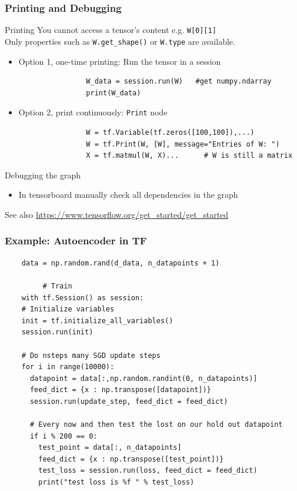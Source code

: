 \documentclass[mathserif]{beamer}
\begin{document}
\begin{frame}[fragile]
	\frametitle{Printing and Debugging}
	\begin{block}{Printing}
		You cannot access a tensor's content e.g. \texttt{W[0][1]}\\
		Only properties such as \texttt{W.get\_shape()} or \texttt{W.type} are available.
		\begin{itemize}		
			\item Option 1, one-time printing: Run the tensor in a session
			\begin{verbatim}
				W_data = session.run(W)   #get numpy.ndarray
				print(W_data) 
			\end{verbatim}
			\item Option 2, print continuously: \texttt{Print} node
			\begin{verbatim}
				W = tf.Variable(tf.zeros([100,100]),...)
				W = tf.Print(W, [W], message="Entries of W: ")
				X = tf.matmul(W, X)...		# W is still a matrix
			\end{verbatim}
		\end{itemize}
	\end{block}
	


	\begin{block}{Debugging the graph}
		\begin{itemize}
			\item In tensorboard manually check all dependencies in the graph
		\end{itemize}
	\end{block}
	
	See also \url{https://www.tensorflow.org/get\_started/get\_started}
\end{frame}

\begin{frame}[fragile]
	\frametitle{Example: Autoencoder in TF}
	\begin{verbatim}
    data = np.random.rand(d_data, n_datapoints + 1) 
  	
  		 # Train
  	with tf.Session() as session:
    # Initialize variables
    init = tf.initialize_all_variables() 
    session.run(init)
    
    # Do nsteps many SGD update steps
    for i in range(10000):
      datapoint = data[:,np.random.randint(0, n_datapoints)]
      feed_dict = {x : np.transpose([datapoint])}
      session.run(update_step, feed_dict = feed_dict)
      
      # Every now and then test the lost on our hold out datapoint 
      if i % 200 == 0:
        test_point = data[:, n_datapoints]
        feed_dict = {x : np.transpose([test_point])}
        test_loss = session.run(loss, feed_dict = feed_dict)
        print("test loss is %f " % test_loss)

  	\end{verbatim}
\end{frame}
\end{document}
